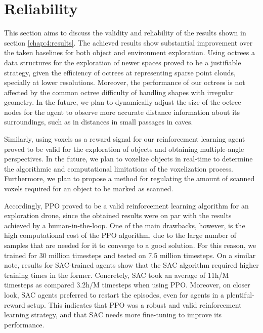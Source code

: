 \section{Reliability}\label{sec:results-reliability}
    This section aims to discuss the validity and reliability of the results shown in section \ref{chap:4:results}.
    The achieved results show substantial improvement over the taken baselines for both object and environment exploration. 
    Using octrees a data structures for the exploration of newer spaces proved to be a justifiable strategy, given the efficiency of octrees at representing sparse point clouds, specially at lower resolutions. Moreover, the performance of our octrees is not affected by the common octree difficulty of handling shapes with irregular geometry. In the future, we plan to dynamically adjust the size of the octree nodes for the agent to observe more accurate distance  information about its surroundings, such as in distances in small passages in caves.
    
    Similarly, using voxels as a reward signal for our reinforcement learning agent proved to be valid for the exploration of objects and obtaining multiple-angle perspectives. 
    In the future, we plan to voxelize objects in real-time to determine the algorithmic and computational limitations of the voxelization process. Furthermore, we plan to propose a method for regulating the amount of scanned voxels required for an object to be marked as scanned.
   
    Accordingly, PPO proved to be a valid reinforcement learning algorithm for an exploration drone, since the obtained results were on par with the results achieved by a human-in-the-loop.
        One of the main drawbacks, however, is the high computational cost of the PPO algorithm, due to the large number of samples that are needed for it to converge to a good solution. 
        For this reason, we trained for 30 million timesteps and tested on 7.5 million timesteps. 
        On a similar note, results for SAC-trained agents show that the SAC algorithm required higher training times in the former. Concretely, SAC took an average of 11h/M timesteps as compared  3.2h/M timesteps when using PPO. Moreover, on closer look, SAC agents preferred to restart the episodes, even for agents in a plentiful-reward setup. This indicates that PPO was a robust and valid reinforcement learning strategy, and that SAC needs more fine-tuning to improve its performance.
        
